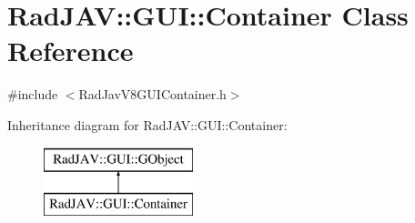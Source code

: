 \hypertarget{class_rad_j_a_v_1_1_g_u_i_1_1_container}{}\section{Rad\+J\+AV\+:\+:G\+UI\+:\+:Container Class Reference}
\label{class_rad_j_a_v_1_1_g_u_i_1_1_container}


{\ttfamily \#include $<$Rad\+Jav\+V8\+G\+U\+I\+Container.\+h$>$}

Inheritance diagram for Rad\+J\+AV\+:\+:G\+UI\+:\+:Container\+:\begin{figure}[H]
\begin{center}
\leavevmode
\includegraphics[height=2.000000cm]{class_rad_j_a_v_1_1_g_u_i_1_1_container}
\end{center}
\end{figure}
